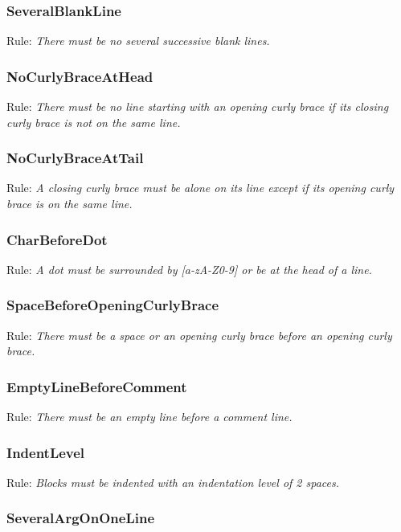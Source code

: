 \subsubsection{SeveralBlankLine}

Rule:
\emph{There must be no several successive blank lines.}

\subsubsection{NoCurlyBraceAtHead}

Rule:
\emph{There must be no line starting with an opening curly brace if its closing curly brace is not on the same line.}

\subsubsection{NoCurlyBraceAtTail}

Rule:
\emph{A closing curly brace must be alone on its line except if its opening curly brace is on the same line.}

\subsubsection{CharBeforeDot}

Rule:
\emph{A dot must be surrounded by [a-zA-Z0-9] or be at the head of a line.}

\subsubsection{SpaceBeforeOpeningCurlyBrace}

Rule:
\emph{There must be a space or an opening curly brace before an opening curly brace.}

\subsubsection{EmptyLineBeforeComment}

Rule:
\emph{There must be an empty line before a comment line.}

\subsubsection{IndentLevel}

Rule:
\emph{Blocks must be indented with an indentation level of 2 spaces.}

\subsubsection{SeveralArgOnOneLine}

